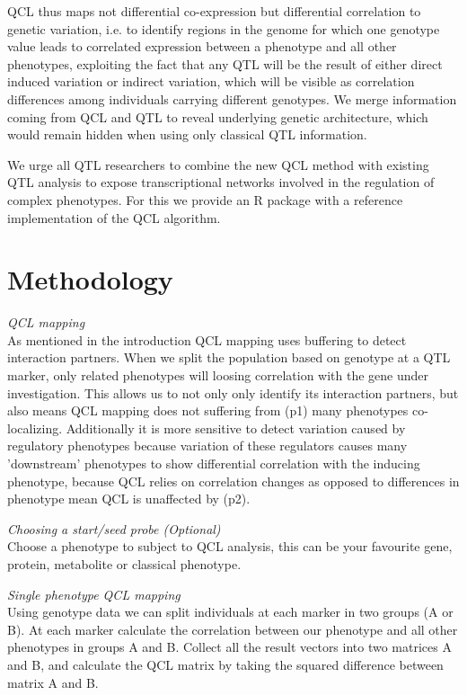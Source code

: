 \documentclass[12pt]{article}
\begin{document}
  QCL thus maps not differential co-expression but differential correlation to genetic 
  variation, i.e. to identify regions in the genome for which one genotype value leads to 
  correlated expression between a phenotype and all other phenotypes, exploiting the fact 
  that any QTL will be the result of either direct induced variation or indirect variation, 
  which will be visible as correlation differences among individuals carrying different genotypes. 
  We merge information coming from QCL and QTL to reveal underlying genetic architecture, 
  which would remain hidden when using only classical QTL information.

  We urge all QTL researchers to combine the new QCL method with existing QTL analysis to expose 
  transcriptional networks involved in the regulation of complex phenotypes. For this we 
  provide an R package with a reference implementation of the QCL algorithm.
\bigskip 

\section*{Methodology}
\nopagebreak

\emph{\sffamily QCL mapping}\\
  As mentioned in the introduction QCL mapping uses buffering to detect interaction partners. 
  When we split the population based on genotype at a QTL marker, only related phenotypes 
  will loosing correlation with the gene under investigation. This allows us to not only 
  only identify its interaction partners, but also means QCL mapping does not suffering from 
  (p1) many phenotypes co-localizing. Additionally it is more sensitive to detect variation 
  caused by regulatory phenotypes because variation of these regulators causes many 'downstream' 
  phenotypes to show differential correlation with the inducing phenotype, because QCL relies on 
  correlation changes as opposed to differences in phenotype mean QCL is unaffected by (p2).

\emph{\sffamily Choosing a start/seed probe (Optional)}\\
  Choose a phenotype to subject to QCL analysis, this can be your favourite gene, 
  protein, metabolite or classical phenotype.

\emph{\sffamily Single phenotype QCL mapping}\\
  Using genotype data we can split individuals at each marker in two groups (A or B).
  At each marker calculate the correlation between our phenotype and all other 
  phenotypes in groups A and B. Collect all the result vectors into two matrices A 
  and B, and calculate the QCL matrix by taking the squared difference between matrix A 
  and B.
\end{document}
